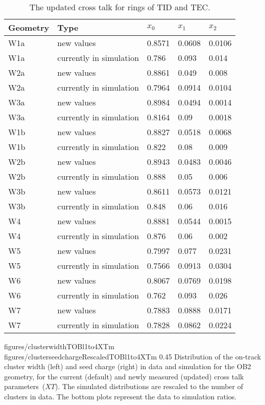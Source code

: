 \begin{table}[h]
\begin{center}
\begin{tabular}{|l|l|l|l|l|}
\hline
Geometry & Type & $x_{0}$ & $x_{1}$ & $x_{2}$ \\
\hline
\hline
W1a &  new values & 0.8571 & 0.0608 & 0.0106 \\
W1a &  currently in simulation & 0.786 & 0.093 & 0.014 \\
\hline
W2a &  new values & 0.8861 & 0.049 & 0.008 \\
W2a &  currently in simulation & 0.7964 & 0.0914 & 0.0104 \\
\hline
W3a &  new values & 0.8984 & 0.0494 & 0.0014 \\
W3a &  currently in simulation & 0.8164 & 0.09 & 0.0018 \\
\hline
W1b &  new values & 0.8827 & 0.0518 & 0.0068 \\
W1b &  currently in simulation & 0.822 & 0.08 & 0.009 \\
\hline
W2b &  new values & 0.8943 & 0.0483 & 0.0046 \\
W2b &  currently in simulation & 0.888 & 0.05 & 0.006 \\
\hline
W3b &  new values & 0.8611 & 0.0573 & 0.0121 \\
W3b &  currently in simulation & 0.848 & 0.06 & 0.016 \\
\hline
W4 &  new values & 0.8881 & 0.0544 & 0.0015 \\
W4 &  currently in simulation & 0.876 & 0.06 & 0.002 \\
\hline
W5 &  new values & 0.7997 & 0.077 & 0.0231 \\
W5 &  currently in simulation & 0.7566 & 0.0913 & 0.0304 \\
\hline
W6 &  new values & 0.8067 & 0.0769 & 0.0198 \\
W6 &  currently in simulation & 0.762 & 0.093 & 0.026 \\
\hline
W7 &  new values & 0.7883 & 0.0888 & 0.0171 \\
W7 &  currently in simulation & 0.7828 & 0.0862 & 0.0224 \\
\hline
\end{tabular}
\caption[Table caption text]{The updated cross talk for rings of TID and TEC. }
\label{tab:measuredXtalkTODTEC2}
\end{center}
\end{table}


                 {figures/clusterwidthTOBl1to4XTm}
                 {figures/clusterseedchargeRescaledTOBl1to4XTm} %
                 {0.45}       %
                 { Distribution of the on-track cluster width (left) and seed charge (right)  in data and simulation for the OB2 geometry, for the current (default) and newly measured (updated) cross talk parameters~($XT$).  The simulated distributions are rescaled to the number of clusters in data.  The bottom plots represent the data to simulation ratios. }


